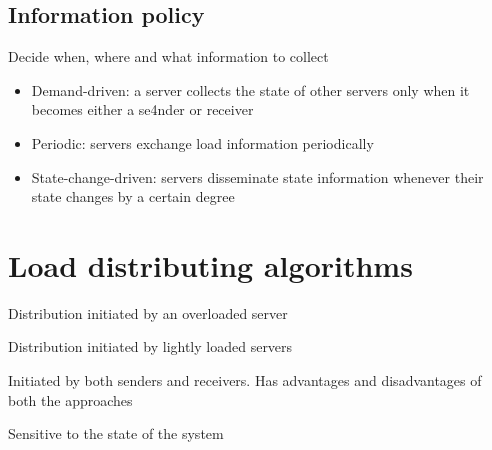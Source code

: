 \documentclass{article}[18pt]
\begin{document}
\subsection{Information policy}
Decide when, where and what information to collect
\begin{itemize}
	\item Demand-driven: a server collects the state of other servers only when it becomes either a se4nder or receiver
	\item Periodic: servers exchange load information periodically
	\item State-change-driven: servers disseminate state information whenever their state changes by a certain degree
\end{itemize}
\section{Load distributing algorithms}
\begin{definition}
	Distribution initiated by an overloaded server
\end{definition}
\begin{definition}
	Distribution initiated by lightly loaded servers
\end{definition}
\begin{definition}[Symmetric]
	Initiated by both senders and receivers. Has advantages and disadvantages of both the approaches
\end{definition}
\begin{definition}[Adaptive]
	Sensitive to the state of the system
\end{definition}
\end{document}
